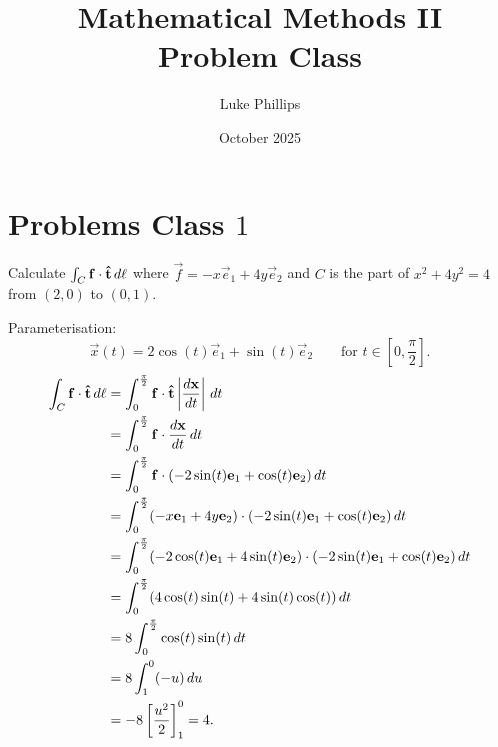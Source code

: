 \documentclass[10pt, a4paper]{article}
\title{Mathematical Methods II \\
    \large Problem Class}
\author{Luke Phillips}
\date{October 2025}
\begin{document}
\maketitle

\newpage

\tableofcontents

\newpage

\section{Problems Class \texorpdfstring{$1$}{}}

\begin{problem}[$2012$ question $2$]
    Calculate $\int_{C}\mathbf{f}\cdot\mathbf{\hat{t}}\,d\ell$ where $\vec{f} = -x\vec{e}_1 + 4y\vec{e}_2$ and $C$ is the part of $x ^ 2 + 4y ^ 2 = 4$ from $(2, 0)$ to $(0, 1)$.

    \begin{solution}
        Parameterisation:
        \[
        \vec{x}(t) = 2\cos(t)\vec{e}_1 + \sin(t)\vec{e}_2\qquad\text{for } t \in [0, \frac{\pi}{2}].
        \]
        \begin{align*}
            \int_{C}\mathbf{f}\cdot\mathbf{\hat{t}}\,d\ell &= \int_{0}^{\frac{\pi}{2}}\mathbf{f}\cdot\mathbf{\hat{t}}\left|\frac{d\mathbf{x}}{dt}\right|\,dt \\
            &= \int_{0}^{\frac{\pi}{2}}\mathbf{f}\cdot\frac{d\mathbf{x}}{dt}\,dt \\
            &= \int_{0}^{\frac{\pi}{2}}\mathbf{f}\cdot(-2\sin(t)\mathbf{e}_1 + \cos(t)\mathbf{e}_2)\,dt \\
            &= \int_{0}^{\frac{\pi}{2}}(-x\mathbf{e}_1 + 4y\mathbf{e}_2)\cdot(-2\sin(t)\mathbf{e}_1 + \cos(t)\mathbf{e}_2)\,dt \\
            &= \int_{0}^{\frac{\pi}{2}}(-2\cos(t)\mathbf{e}_1 + 4\sin(t)\mathbf{e}_2)\cdot(-2\sin(t)\mathbf{e}_1 + \cos(t)\mathbf{e}_2)\,dt \\
            &= \int_{0}^{\frac{\pi}{2}}(4\cos(t)\sin(t) + 4\sin(t)\cos(t))\,dt \\
            &= 8\int_{0}^{\frac{\pi}{2}}\cos(t)\sin(t)\,dt \\
            &= 8\int_{1}^{0}(-u)\,du \\
            &= -8\left[\frac{u ^ 2}{2}\right]_{1}^{0} = 4.
        \end{align*}
    \end{solution}
\end{problem}
\end{document}
